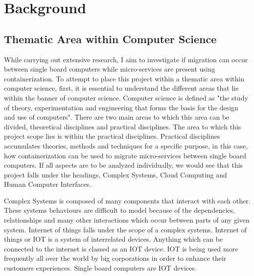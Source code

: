 \chapter{Background}
\label{chap:background}


\section{Thematic Area within Computer Science}
While carrying out extensive research, I aim to investigate if migration can occur between single board computers while micro-services are present using containerization. To attempt to place this project within a thematic area within computer science, first, it is essential to understand the different areas that lie within the banner of computer science. Computer science is defined as "the study of theory, experimentation and engineering that forms the basis for the design and use of computers". \cite{Reference16} There are two main areas to which this area can be divided, theoretical disciplines and practical disciplines. The area to which this project scope lies is within the practical disciplines. Practical disciplines accumulates theories, methods and techniques for a specific purpose, in this case, how containerization can be used to migrate micro-services between single board computers. If all aspects are to be analyzed individually, we would see that this project falls under the headings, Complex Systems, Cloud Computing and Human Computer Interfaces. 

Complex Systems is composed of many components that interact with each other. These systems behaviours are difficult to model because of the dependencies, relationships and many other interactions which occur between parts of any given system. Internet of things falls under the scope of a complex systems. Internet of things or IOT is a system of interrelated devices. Anything which can be connected to the internet is classed as an IOT device. IOT is being used more frequently all over the world by big corporations in order to enhance their customers experiences. Single board computers are IOT devices.

